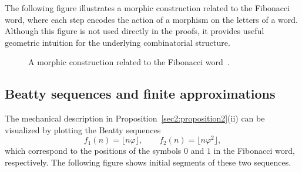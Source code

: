 \documentclass[12pt, a4paper]{article}
\begin{document}
The following figure illustrates a morphic construction related to the Fibonacci word, where each step encodes the action of a morphism on the letters of a word. Although this figure is not used directly in the proofs, it provides useful geometric intuition for the underlying combinatorial structure.

\begin{figure}[H]
\centering
{}
\caption{A morphic construction related to the Fibonacci word~\cite{Berstel2007}.}
\label{fig001Morphism}
\end{figure}
\subsection{Beatty sequences and finite approximations}

The mechanical description in Proposition~\ref{sec2:proposition2}(ii) can be visualized by plotting the Beatty sequences
\[
f_1(n) = \lfloor n\varphi \rfloor,
\qquad
f_2(n) = \lfloor n\varphi^2 \rfloor,
\]
which correspond to the positions of the symbols $0$ and $1$ in the Fibonacci word, respectively. The following figure shows initial segments of these two sequences.
\end{document}
